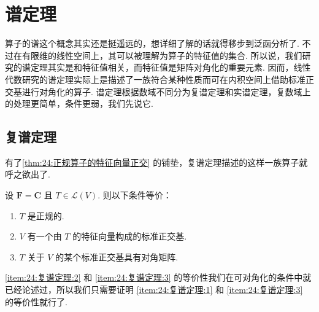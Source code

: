 \section{谱定理}

算子的谱这个概念其实还是挺遥远的，想详细了解的话就得移步到泛函分析了. 不过在有限维的线性空间上，其可以被理解为算子的特征值的集合. 所以说，我们研究的谱定理其实是和特征值相关，而特征值是矩阵对角化的重要元素. 因而，线性代数研究的谱定理实际上是描述了一族符合某种性质而可在内积空间上借助标准正交基进行对角化的算子. 谱定理根据数域不同分为复谱定理和实谱定理，复数域上的处理更简单，条件更弱，我们先说它.

\subsection{复谱定理}

有了\autoref{thm:24:正规算子的特征向量正交} 的铺垫，复谱定理描述的这样一族算子就呼之欲出了.

\begin{theorem}[复谱定理] \label{thm:24:复谱定理} 
    设 $ \mathbf{F} = \mathbf{C} $ 且 $ T \in \mathcal{L}(V) $. 则以下条件等价：
    \begin{enumerate}
        \item \label{item:24:复谱定理:1}
              $ T $ 是正规的.

        \item \label{item:24:复谱定理:2}
              $ V $ 有一个由 $ T $ 的特征向量构成的标准正交基.

        \item \label{item:24:复谱定理:3}
              $ T $ 关于 $ V $ 的某个标准正交基具有对角矩阵.
    \end{enumerate}
\end{theorem}

\ref*{item:24:复谱定理:2} 和 \ref*{item:24:复谱定理:3} 的等价性我们在可对角化的条件中就已经论述过，所以我们只需要证明 \ref*{item:24:复谱定理:1} 和 \ref*{item:24:复谱定理:3} 的等价性就行了.

